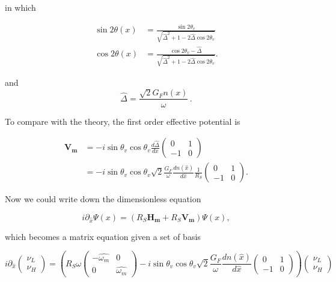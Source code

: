 \documentclass{tufte-handout}
\begin{document}
in which

\begin{align*}
\sin 2\theta(x)  &= \frac{\sin 2\theta_v}{\sqrt{ \hat\Delta ^2+1 - 2 \hat\Delta \cos 2\theta_v }} \\
\cos 2\theta(x)&= \frac{ \cos 2\theta_v - \hat\Delta  }{ \sqrt{\hat\Delta ^2  +1 - 2 \hat\Delta \cos 2\theta_v } }.
\end{align*}

and
\begin{equation*}
\hat\Delta = \frac{\sqrt{2}G_F n(x)}{\omega} \, .
\end{equation*}


To compare with the theory, the first order effective potential is

\begin{align*}
\mathbf{V_m} & = - i\sin\theta_v \cos\theta_v \frac{d\hat\Delta}{dx} \begin{pmatrix}
0 & 1 \\
-1 & 0
\end{pmatrix}\\
& = -i \sin\theta_v\cos\theta_v \sqrt{2}\frac{G_F}{\omega} \frac{d n(\hat x)}{d\hat x} \frac{1}{R_S} \begin{pmatrix}
0 & 1 \\
-1 & 0
\end{pmatrix}.
\end{align*}

Now we could write down the dimensionless equation

\begin{equation*}
i \partial_{\hat x} \Psi(x) = ( R_S \mathbf{H_m} + R_S \mathbf{V_m} ) \Psi(x),
\end{equation*}

which becomes a matrix equation given a set of basis

\begin{equation*}
i \partial_{\hat x} \begin{pmatrix}
\nu_L \\
\nu_H
\end{pmatrix} = \left(
R_S \omega \begin{pmatrix}
- \hat{\omega_m} & 0 \\
0 & \hat{\omega_m}
\end{pmatrix} - i \sin\theta_v\cos\theta_v \sqrt{2} \frac{G_F}{\omega} \frac{d n(\hat x)}{d\hat x} \begin{pmatrix}
0 & 1 \\
-1 & 0
\end{pmatrix}
\right)  
\begin{pmatrix}
\nu_L \\
\nu_H
\end{pmatrix}
\end{equation*}
\end{document}
